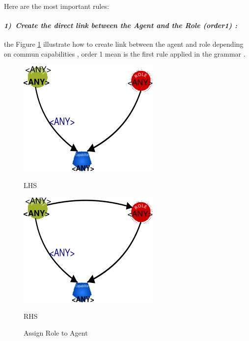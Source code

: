   
\pagebreak

Here are the most important rules:  

\paragraph{\emph{1)~Create the direct link  between the Agent and the Role (order1) :} } 

the Figure \ref{fig:Create link between Agent and Role} illustrate how to create link between the agent and role depending on commun capabilities , order 1 mean is the first rule applied in the grammar . 

\vspace{1cm}
\begin{figure}[th]
\centering
\begin{minipage}{.6\textwidth}
   \includegraphics[width=.7\linewidth]{Chapiter3/img/L1}
	\linebreak
	
	\hspace{2.5cm}  LHS
\end{minipage}%
\begin{minipage}{.6\textwidth}
  \includegraphics[width=.7\linewidth]{Chapiter3/img/R1}
  \linebreak  
  
  \hspace{2.5cm}  RHS 
\end{minipage}
\caption{\label{fig:Create link between Agent and Role}Assign Role to Agent } 
\end{figure}
 

